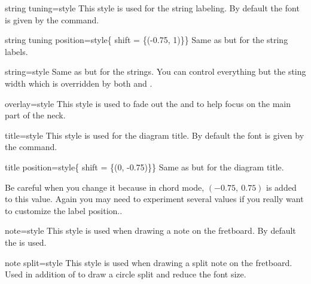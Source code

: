 \documentclass[a4paper]{article}
\begin{document}
\begin{docKey}[tikz][]{string tuning}{=style}{}
  This style is used for the string labeling. By default the font is given
  by the  command.
\end{docKey}

\begin{docKey}[tikz][]{string tuning position}{=style}{\{ shift = \{(-0.75, 1)\}\}}
  Same as  but for the string labels.
\end{docKey}

\begin{docKey}[tikz][]{string}{=style}{}
  Same as  but for the strings. You can control
  everything but the sting width which is overridden by both
   and .
\end{docKey}

\begin{docKey}[tikz][]{overlay}{=style}{}
  This style is used to fade out the  and
   to help focus on the main part of the neck.
\end{docKey}

\begin{docKey}[tikz][]{title}{=style}{}
  This style is used for the diagram title. By default the font is given
  by the  command.
\end{docKey}

\begin{docKey}[tikz][]{title position}{=style}{\{ shift = \{(0, -0.75)\}\}}
  Same as  but for the diagram title.

  Be careful when you change it because in chord mode, $(-0.75,~0.75)$ is
  added to this value. Again you may need to experiment several values if
  you really want to customize the label position..
\end{docKey}

\begin{docKey}[tikz][]{note}{=style}{}
  This style is used when drawing a note on the fretboard. By default the
   is used.
\end{docKey}

\begin{docKey}[tikz][]{note split}{=style}{}
  This style is used when drawing a split note on the fretboard. Used in
  addition of  to draw a circle split and reduce the font
  size.
\end{docKey}
\end{document}
